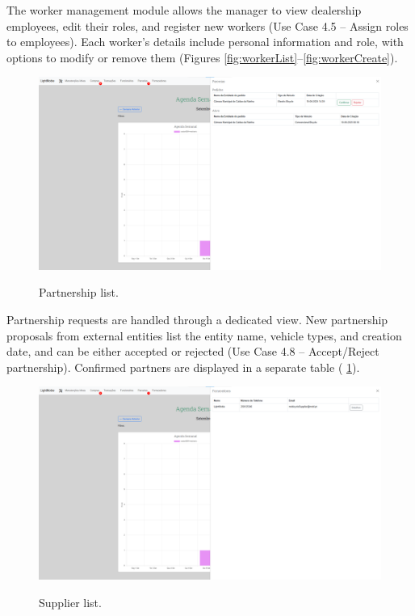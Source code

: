 The worker management module allows the manager to view dealership employees, edit their roles, and register new workers (Use Case 4.5 – Assign roles to employees). Each worker's details include personal information and role, with options to modify or remove them (Figures \ref{fig:workerList}–\ref{fig:workerCreate}).


\begin{figure}[h]
  \caption{Partnership list.}
  \centering
  \includegraphics[width=\textwidth]{figs/Implementation/workshopmanager/partnershipList}
  \label{fig:partnershipList}
\end{figure}


Partnership requests are handled through a dedicated view. New partnership proposals from external entities list the entity name, vehicle types, and creation date, and can be either accepted or rejected (Use Case 4.8 – Accept/Reject partnership). Confirmed partners are displayed in a separate table ( \ref{fig:partnershipList}).


\begin{figure}[h]
  \caption{Supplier list.}
  \centering
  \includegraphics[width=\textwidth]{figs/Implementation/workshopmanager/supplierList}
  \label{fig:workshopmanagerSupplierList}
\end{figure}

